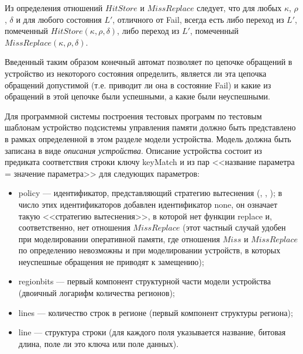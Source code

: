 Из определения отношений $HitStore$ и $MissReplace$ следует, что для любых $\kappa$, $\rho$, $\delta$ и для любого состояния $L'$, отличного от Fail, всегда есть либо переход из $L'$, помеченный $HitStore(\kappa, \rho, \delta)$, либо переход из $L'$, помеченный $MissReplace(\kappa, \rho, \delta)$.

Введенный таким образом конечный автомат позволяет по цепочке обращений в устройство из некоторого состояния определить, является ли эта цепочка обращений допустимой (т.е. приводит ли она в состояние Fail) и какие из обращений в этой цепочке были успешными, а какие были неуспешными.


Для программной системы построения тестовых программ по тестовым шаблонам устройство подсистемы управления памяти должно быть представлено в рамках определенной в этом разделе модели устройства. Модель должна быть записана в виде \emph{описания устройства}. Описание устройства состоит из предиката соответствия строки ключу keyMatch и из пар <<название параметра = значение параметра>> для следующих параметров:
\begin{itemize}
    \item policy --- идентификатор, представляющий стратегию вытеснения (\LRU, \FIFO, \PseudoLRU); в число этих идентификаторов добавлен идентификатор none, он означает такую <<стратегию вытеснения>>, в которой нет функции replace и, соответственно, нет отношения $MissReplace$ (этот частный случай удобен при моделировании оперативной памяти, где отношения $Miss$ и $MissReplace$ по определению невозможны и при моделировании устройств, в которых неуспешные обращения не приводят к замещению);
    \item regionbits --- первый компонент структурной части модели устройства (двоичный логарифм количества регионов);
    \item lines --- количество строк в регионе (первый компонент структуры региона);
    \item line --- структура строки (для каждого поля указывается название, битовая длина, поле ли это ключа или поле данных).
\end{itemize}

